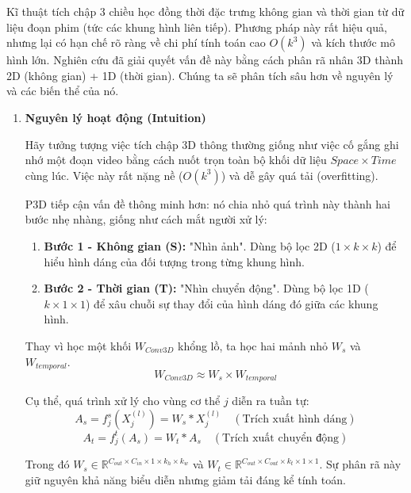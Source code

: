 Kĩ thuật tích chập 3 chiều học đồng thời đặc trưng không gian và thời gian từ dữ liệu đoạn phim (tức các khung hình liên tiếp). Phương pháp này rất hiệu quả, nhưng lại có hạn chế rõ ràng về chi phí tính toán cao $O(k^3)$ và kích thước mô hình lớn. Nghiên cứu \cite{p3d} đã giải quyết vấn đề này bằng cách phân rã nhân 3D thành 2D (không gian) + 1D (thời gian). Chúng ta sẽ phân tích sâu hơn về nguyên lý và các biến thể của nó.
\begin{enumerate}
  \item \textbf{Nguyên lý hoạt động (Intuition)}

        Hãy tưởng tượng việc tích chập 3D thông thường giống như việc cố gắng ghi nhớ một đoạn video bằng cách nuốt trọn toàn bộ khối dữ liệu $Space \times Time$ cùng lúc. Việc này rất nặng nề ($O(k^3)$) và dễ gây quá tải (overfitting).

        P3D tiếp cận vấn đề thông minh hơn: nó chia nhỏ quá trình này thành hai bước nhẹ nhàng, giống như cách mắt người xử lý:
        \begin{enumerate}
          \item \textbf{Bước 1 - Không gian (S):} "Nhìn ảnh". Dùng bộ lọc 2D ($1 \times k \times k$) để hiểu hình dáng của đối tượng trong từng khung hình.
          \item \textbf{Bước 2 - Thời gian (T):} "Nhìn chuyển động". Dùng bộ lọc 1D ($k \times 1 \times 1$) để xâu chuỗi sự thay đổi của hình dáng đó giữa các khung hình.
        \end{enumerate}

        Thay vì học một khối $W_{Conv3D}$ khổng lồ, ta học hai mảnh nhỏ $W_{s}$ và $W_{temporal}$.
        \begin{equation}
          W_{Conv3D} \approx W_{s} \times W_{temporal}
        \end{equation}

        Cụ thể, quá trình xử lý cho vùng cơ thể $j$ diễn ra tuần tự:
        \begin{equation}
          A_s = f_{j}^s\left(X_{j}^{(l)}\right) = W_{s} \ast X_{j}^{(l)} \quad (\text{Trích xuất hình dáng})
        \end{equation}
        \begin{equation}
          A_t = f_{j}^t\left(A_s\right) = W_{t} \ast A_s \quad (\text{Trích xuất chuyển động})
        \end{equation}

        Trong đó $W_{s} \in \mathbb{R}^{C_{out} \times C_{in} \times 1 \times k_h \times k_w}$ và $W_{t} \in \mathbb{R}^{C_{out} \times C_{out} \times k_t \times 1 \times 1}$. Sự phân rã này giữ nguyên khả năng biểu diễn nhưng giảm tải đáng kể tính toán.


\end{enumerate}
